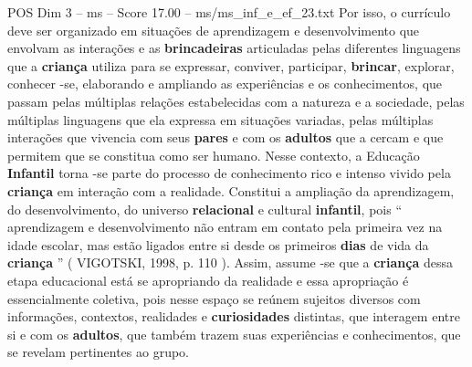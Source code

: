 \begin{textsample}{POS Dim 3 – ms – Score 17.00 – ms/ms\_inf\_e\_ef\_23.txt}
Por isso, o currículo deve ser organizado em situações de aprendizagem e desenvolvimento que envolvam as interações e as \textbf{brincadeiras} articuladas pelas diferentes linguagens que a \textbf{criança} utiliza para se expressar, conviver, participar, \textbf{brincar}, explorar, conhecer -se, elaborando e ampliando as experiências e os conhecimentos, que passam pelas múltiplas relações estabelecidas com a natureza e a sociedade, pelas múltiplas linguagens que ela expressa em situações variadas, pelas múltiplas interações que vivencia com seus \textbf{pares} e com os \textbf{adultos} que a cercam e que permitem que se constitua como ser humano.
Nesse contexto, a Educação \textbf{Infantil} torna -se parte do processo de conhecimento rico e intenso vivido pela \textbf{criança} em interação com a realidade.
Constitui a ampliação da aprendizagem, do desenvolvimento, do universo \textbf{relacional} e cultural \textbf{infantil}, pois “ aprendizagem e desenvolvimento não entram em contato pela primeira vez na idade escolar, mas estão ligados entre si desde os primeiros \textbf{dias} de vida da \textbf{criança} ” ( VIGOTSKI, 1998, p. 110 ).
Assim, assume -se que a \textbf{criança} dessa etapa educacional está se apropriando da realidade e essa apropriação é essencialmente coletiva, pois nesse espaço se reúnem sujeitos diversos com informações, contextos, realidades e \textbf{curiosidades} distintas, que interagem entre si e com os \textbf{adultos}, que também trazem suas experiências e conhecimentos, que se revelam pertinentes ao grupo.

\end{textsample}
